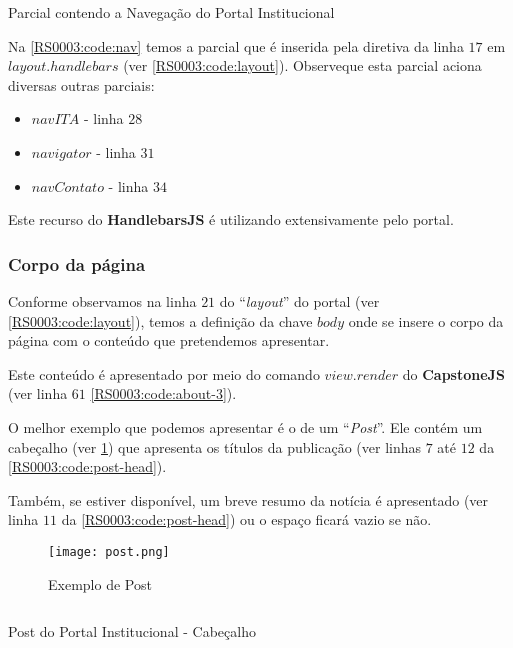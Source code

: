 \begin{code}
    \inputminted[label=nav.handlebars]{HTML}{../RS0003/anexos/nav.handlebars}
    \caption{Parcial contendo a Navegação do Portal Institucional}\label{RS0003:code:nav}
\end{code}

Na \cref{RS0003:code:nav} temos a parcial que é inserida pela diretiva da linha $17$ em $layout.handlebars$ (ver \cref{RS0003:code:layout}). Observeque esta parcial aciona diversas outras parciais:

\begin{itemize}
    \item $navITA$ - linha $28$
    \item $navigator$ - linha $31$
    \item $navContato$ - linha $34$
\end{itemize}

Este recurso do \textbf{HandlebarsJS} é utilizando extensivamente pelo portal.


\subsubsection{Corpo da página}

Conforme observamos na linha $21$ do ``\textit{layout}'' do portal (ver \cref{RS0003:code:layout}), temos a definição da chave $body$ onde se insere o corpo da página com o conteúdo que pretendemos apresentar.

Este conteúdo é apresentado por meio do comando $view.render$ do \textbf{CapstoneJS} (ver linha $61$ \cref{RS0003:code:about-3}).

O melhor exemplo que podemos apresentar é o de um ``\textit{Post}''. Ele contém um cabeçalho (ver \cref{RS0003:fig:post}) que apresenta os títulos da publicação (ver linhas $7$ até $12$ da \cref{RS0003:code:post-head}).

Também, se estiver disponível, um breve resumo da notícia é apresentado (ver linha $11$ da \cref{RS0003:code:post-head}) ou o espaço ficará vazio se não.

\begin{figure}[!ht]
    \centering
    \texttt{[image: post.png]}
    \caption{Exemplo de Post}\label{RS0003:fig:post}
\end{figure}

\begin{code}
    \inputminted[label=post.handlebars,firstline=1,lastline=12]{HTML}{../RS0003/anexos/post.handlebars}
    \caption{Post do Portal Institucional - Cabeçalho}\label{RS0003:code:post-head}
\end{code}

